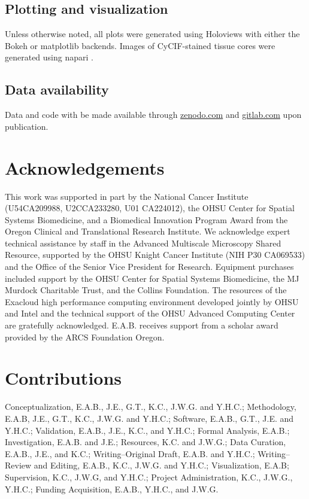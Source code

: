 \documentclass[preprint,review,3p,12pt]{elsarticle}
\begin{document}
\subsection{Plotting and visualization}
Unless otherwise noted, all plots were generated using Holoviews \cite{holoviews1_12_7} with either the Bokeh \cite{bokeh2020} or matplotlib \cite{mpl2007} backends. Images of CyCIF-stained tissue cores were generated using napari \cite{napari_0_3_0}.

\subsection{Data availability}
Data and code with be made available through \url{zenodo.com} and \url{gitlab.com} upon publication.

\section{Acknowledgements}
This work was supported in part by the National Cancer Institute (U54CA209988, U2CCA233280, U01 CA224012), the OHSU Center for Spatial Systems Biomedicine, and a Biomedical Innovation Program Award from the Oregon Clinical and Translational Research Institute. We acknowledge expert technical assistance by staff in the Advanced Multiscale Microscopy Shared Resource, supported by the OHSU Knight Cancer Institute (NIH P30 CA069533) and the Office of the Senior Vice President for Research. Equipment purchases included support by the OHSU Center for Spatial Systems Biomedicine, the MJ Murdock Charitable Trust, and the Collins Foundation. The resources of the Exacloud high performance computing environment developed jointly by OHSU and Intel and the technical support of the OHSU Advanced Computing Center are gratefully acknowledged. E.A.B. receives support from a scholar award provided by the ARCS Foundation Oregon.

\section{Contributions}
Conceptualization, E.A.B., J.E., G.T., K.C., J.W.G. and Y.H.C.; Methodology, E.A.B, J.E., G.T., K.C., J.W.G. and Y.H.C.; Software, E.A.B., G.T., J.E. and Y.H.C.; Validation, E.A.B., J.E., K.C., and Y.H.C.; Formal Analysis, E.A.B.; Investigation, E.A.B. and J.E.; Resources, K.C. and J.W.G.; Data Curation, E.A.B., J.E., and K.C.; Writing–Original Draft, E.A.B. and Y.H.C.; Writing–Review and Editing, E.A.B., K.C., J.W.G. and Y.H.C.; Visualization, E.A.B; Supervision, K.C., J.W.G, and Y.H.C.; Project Administration, K.C., J.W.G., Y.H.C.; Funding Acquisition, E.A.B., Y.H.C., and J.W.G.
\end{document}
